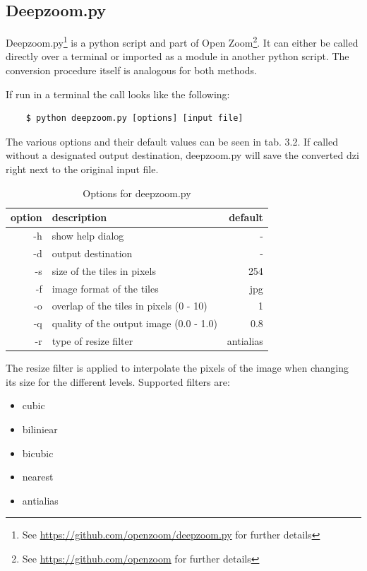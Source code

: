 \subsection{Deepzoom.py}

Deepzoom.py\footnote{See \url{https://github.com/openzoom/deepzoom.py} for further details} is a python script and part of Open Zoom\footnote{See \url{https://github.com/openzoom} for further details}. It can either be called directly over a terminal or imported as a module in another python script. The conversion procedure itself is analogous for both methods.

If run in a terminal the call looks like the following:

\begin{lstlisting}
	$ python deepzoom.py [options] [input file]
\end{lstlisting}

The various options and their default values can be seen in tab. 3.2. If called without a designated output destination, deepzoom.py will save the converted dzi right next to the original input file.

\begin{table}[H]
	\begin{center}
		\begin{tabular}{| r | l | r |}
			\hline
			\textbf{option} & \textbf{description} & \textbf{default} \\ \hline
			-h & show help dialog & - \\ \hline
			-d & output destination & - \\ \hline
			-s & size of the tiles in pixels & 254 \\ \hline
			-f & image format of the tiles & jpg\\ \hline
			-o & overlap of the tiles in pixels (0 - 10) & 1 \\ \hline
			-q & quality of the output image (0.0 - 1.0) & 0.8 \\ \hline
			-r & type of resize filter & antialias \\ \hline
		\end{tabular}
		\caption{Options for deepzoom.py}
	\end{center}
\end{table}

The resize filter is applied to interpolate the pixels of the image when changing its size for the different levels. Supported filters are:

\begin{itemize}
	\item cubic
	\item biliniear
	\item bicubic
	\item nearest
	\item antialias
\end{itemize}


